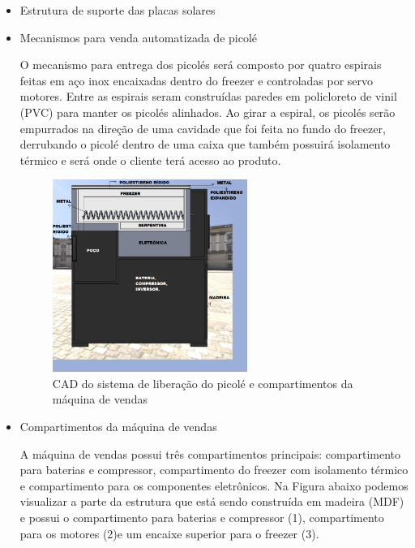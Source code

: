  \begin{itemize}
\item Estrutura de suporte das placas solares

\item Mecanismos para venda automatizada de picolé

O mecanismo para entrega dos picolés será composto por quatro espirais feitas em aço inox encaixadas dentro do freezer e controladas por servo motores. Entre as espirais seram construídas paredes em policloreto de vinil (PVC) para manter os picolés alinhados. Ao girar a espiral, os picolés serão empurrados na direção de uma cavidade que foi feita no fundo do freezer, derrubando o picolé dentro de uma caixa que também possuirá isolamento térmico e será onde o cliente terá acesso ao produto. 

   \begin{figure}[H]
	\centering
    \includegraphics[width=0.6\textwidth]{figuras/cad_vista_lateral}
    \caption{CAD do sistema de liberação do picolé e compartimentos da máquina de vendas}
    \label{fig:cad_vista_lateral}
\end{figure}

\item Compartimentos da máquina de vendas

A máquina de vendas possui três compartimentos principais: compartimento para baterias e compressor, compartimento do freezer com isolamento térmico e compartimento para os componentes eletrônicos. Na Figura abaixo podemos visualizar a parte da estrutura que está sendo construída em madeira (MDF) e possui o compartimento para baterias e compressor (1), compartimento para os motores (2)e um encaixe superior para o freezer (3). 


\end{itemize}

